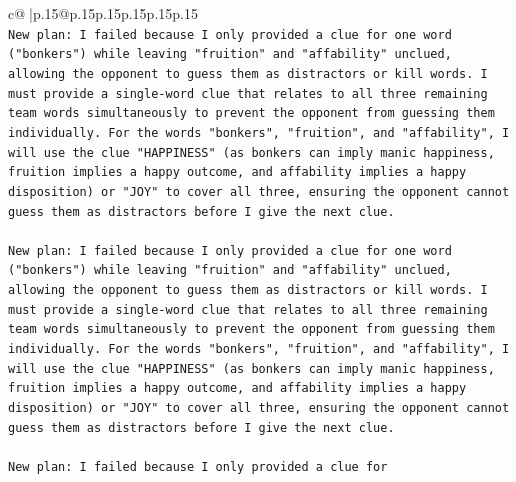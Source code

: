 \documentclass{article}
\begin{document}
{\begin{supertabular}{c@{$\;$}|p{.15\linewidth}@{}p{.15\linewidth}p{.15\linewidth}p{.15\linewidth}p{.15\linewidth}p{.15\linewidth}}
{{{\\ 
\texttt{New plan: I failed because I only provided a clue for one word ("bonkers") while leaving "fruition" and "affability" unclued, allowing the opponent to guess them as distractors or kill words. I must provide a single{-}word clue that relates to all three remaining team words simultaneously to prevent the opponent from guessing them individually. For the words "bonkers", "fruition", and "affability", I will use the clue "HAPPINESS" (as bonkers can imply manic happiness, fruition implies a happy outcome, and affability implies a happy disposition) or "JOY" to cover all three, ensuring the opponent cannot guess them as distractors before I give the next clue.} \\
\\ 
\texttt{New plan: I failed because I only provided a clue for one word ("bonkers") while leaving "fruition" and "affability" unclued, allowing the opponent to guess them as distractors or kill words. I must provide a single{-}word clue that relates to all three remaining team words simultaneously to prevent the opponent from guessing them individually. For the words "bonkers", "fruition", and "affability", I will use the clue "HAPPINESS" (as bonkers can imply manic happiness, fruition implies a happy outcome, and affability implies a happy disposition) or "JOY" to cover all three, ensuring the opponent cannot guess them as distractors before I give the next clue.} \\
\\ 
\texttt{New plan: I failed because I only provided a clue for} \\
\\ 
}}}
\end{supertabular}}
\end{document}

